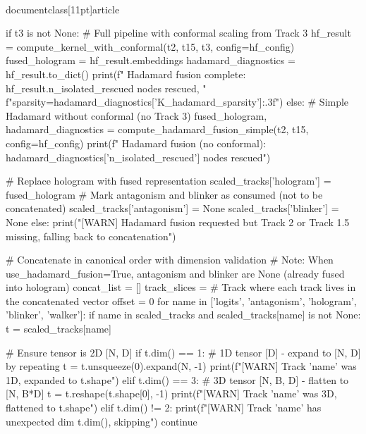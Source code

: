 \\documentclass[11pt]{article}
\begin{document}
\begin{CodeBlock}
                if t3 is not None:
                    # Full pipeline with conformal scaling from Track 3
                    hf_result = compute_kernel_with_conformal(t2, t15, t3, config=hf_config)
                    fused_hologram = hf_result.embeddings
                    hadamard_diagnostics = hf_result.to_dict()
                    print(f"  Hadamard fusion complete: {hf_result.n_isolated_rescued} nodes rescued, "
                          f"sparsity={hadamard_diagnostics['K_hadamard_sparsity']:.3f}")
                else:
                    # Simple Hadamard without conformal (no Track 3)
                    fused_hologram, hadamard_diagnostics = compute_hadamard_fusion_simple(t2, t15, config=hf_config)
                    print(f"  Hadamard fusion (no conformal): {hadamard_diagnostics['n_isolated_rescued']} nodes rescued")

                # Replace hologram with fused representation
                scaled_tracks['hologram'] = fused_hologram
                # Mark antagonism and blinker as consumed (not to be concatenated)
                scaled_tracks['antagonism'] = None
                scaled_tracks['blinker'] = None
            else:
                print("[WARN] Hadamard fusion requested but Track 2 or Track 1.5 missing, falling back to concatenation")

        # Concatenate in canonical order with dimension validation
        # Note: When use_hadamard_fusion=True, antagonism and blinker are None (already fused into hologram)
        concat_list = []
        track_slices = {}  # Track where each track lives in the concatenated vector
        offset = 0
        for name in ['logits', 'antagonism', 'hologram', 'blinker', 'walker']:
            if name in scaled_tracks and scaled_tracks[name] is not None:
                t = scaled_tracks[name]

                # Ensure tensor is 2D [N, D]
                if t.dim() == 1:
                    # 1D tensor [D] - expand to [N, D] by repeating
                    t = t.unsqueeze(0).expand(N, -1)
                    print(f"[WARN] Track '{name}' was 1D, expanded to {t.shape}")
                elif t.dim() == 3:
                    # 3D tensor [N, B, D] - flatten to [N, B*D]
                    t = t.reshape(t.shape[0], -1)
                    print(f"[WARN] Track '{name}' was 3D, flattened to {t.shape}")
                elif t.dim() != 2:
                    print(f"[WARN] Track '{name}' has unexpected dim {t.dim()}, skipping")
                    continue


\end{CodeBlock}
\end{document}
